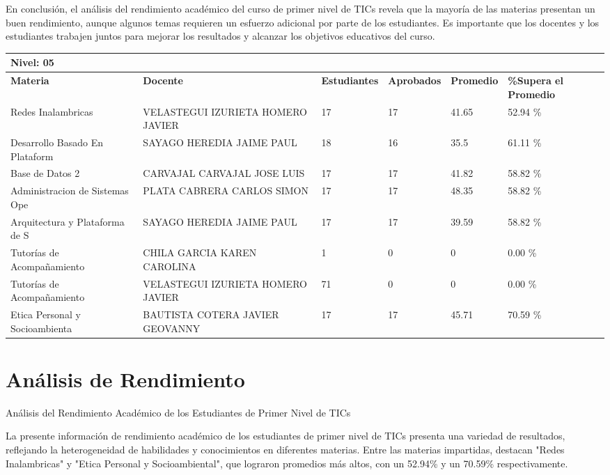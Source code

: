 En conclusión, el análisis del rendimiento académico del curso de primer nivel de TICs revela que la mayoría de las materias presentan un buen rendimiento, aunque algunos temas requieren un esfuerzo adicional por parte de los estudiantes. Es importante que los docentes y los estudiantes trabajen juntos para mejorar los resultados y alcanzar los objetivos educativos del curso.\\
\vspace{1cm}\small
\begin{tabularx}{\textwidth}{|p{2.5cm}|p{2.5cm}|X|X|X|X|}
\hline
\multicolumn{6}{|X|}{\textbf{Nivel: 05 }}\\\hline\textbf{Materia} & \textbf{Docente} & \textbf{Estudiantes} & \textbf{Aprobados} & \textbf{Promedio} & \textbf{\%Supera el Promedio} \\ \hline
Redes Inalambricas & VELASTEGUI IZURIETA HOMERO JAVIER & 17 & 17 & 41.65 & 52.94 \%\\ \hline
Desarrollo Basado En Plataform & SAYAGO HEREDIA JAIME PAUL & 18 & 16 & 35.5 & 61.11 \%\\ \hline
Base de Datos 2 & CARVAJAL CARVAJAL JOSE LUIS & 17 & 17 & 41.82 & 58.82 \%\\ \hline
Administracion de Sistemas Ope & PLATA CABRERA CARLOS SIMON & 17 & 17 & 48.35 & 58.82 \%\\ \hline
Arquitectura y Plataforma de S & SAYAGO HEREDIA JAIME PAUL & 17 & 17 & 39.59 & 58.82 \%\\ \hline
Tutorías de Acompañamiento & CHILA GARCIA KAREN CAROLINA & 1 & 0 & 0 & 0.00 \%\\ \hline
Tutorías de Acompañamiento & VELASTEGUI IZURIETA HOMERO JAVIER & 71 & 0 & 0 & 0.00 \%\\ \hline
Etica Personal y Socioambienta & BAUTISTA COTERA JAVIER GEOVANNY & 17 & 17 & 45.71 & 70.59 \%\\ \hline
\end{tabularx}

\vspace{1cm}
\section{Análisis de Rendimiento}
Análisis del Rendimiento Académico de los Estudiantes de Primer Nivel de TICs

La presente información de rendimiento académico de los estudiantes de primer nivel de TICs presenta una variedad de resultados, reflejando la heterogeneidad de habilidades y conocimientos en diferentes materias. Entre las materias impartidas, destacan "Redes Inalambricas" y "Etica Personal y Socioambiental", que lograron promedios más altos, con un 52.94\% y un 70.59\% respectivamente.


